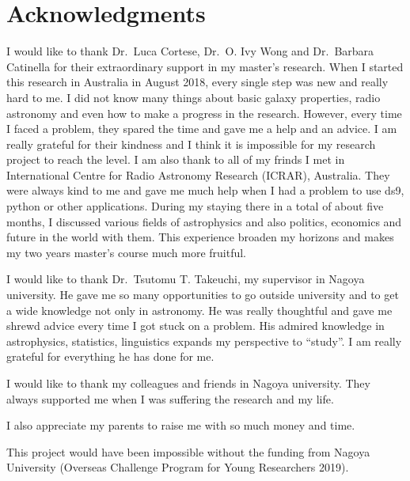 \chapter*{\Large Acknowledgments}

I would like to thank Dr.\ Luca Cortese, Dr.\ O. Ivy Wong and Dr.\ Barbara Catinella for their extraordinary support in my master's research.
When I started this research in Australia in August 2018, every single step was new and really hard to me.
I did not know many things about basic galaxy properties, radio astronomy and even how to make a progress in the research.
However, every time I faced a problem, they spared the time and gave me a help and an advice.
I am really grateful for their kindness and I think it is impossible for my research project to reach the level.
I am also thank to all of my frinds I met in International Centre for Radio Astronomy Research (ICRAR), Australia.
They were always kind to me and gave me much help when I had a problem to use ds9, python or other applications.
During my staying there in a total of about five months, I discussed various fields of astrophysics and also politics, economics and future in the world with them.
This experience broaden my horizons and makes my two years master's course much more fruitful.

I would like to thank Dr.\ Tsutomu T. Takeuchi, my supervisor in Nagoya university.
He gave me so many opportunities to go outside university and to get a wide knowledge not only in astronomy.
He was really thoughtful and gave me shrewd advice every time I got stuck on a problem.
His admired knowledge in astrophysics, statistics, linguistics expands my perspective to ``study''.
I am really grateful for everything he has done for me.

I would like to thank my colleagues and friends in Nagoya university.
They always supported me when I was suffering the research and my life.

I also appreciate my parents to raise me with so much money and time.

This project would have been impossible without the funding from Nagoya University (Overseas Challenge Program for Young Researchers 2019).
